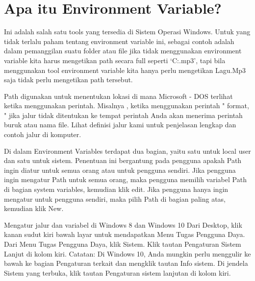 
\section {Apa itu Environment Variable?}

Ini adalah salah satu tools yang tersedia di Sistem Operasi Windows. Untuk yang tidak terlalu paham tentang environment variable ini, sebagai contoh adalah dalam pemanggilan suatu folder atau file jika tidak menggunakan environment variable kita harus mengetikan path secara full seperti `C:\Music\Lagu.mp3', tapi bila menggunakan tool environment variable kita hanya perlu mengetikan Lagu.Mp3 saja tidak perlu mengetikan path tersebut.

Path digunakan untuk menentukan lokasi di mana Microsoft - DOS terlihat ketika menggunakan perintah. Misalnya , ketika menggunakan perintah " format, " jika jalur tidak ditentukan ke tempat perintah Anda akan menerima perintah buruk atau nama file.  Lihat definisi jalur kami untuk penjelasan lengkap dan contoh jalur di komputer.

Di dalam Environment Variables terdapat dua bagian, yaitu satu untuk local user dan satu untuk sistem. Penentuan ini bergantung pada pengguna apakah Path ingin diatur untuk semua orang atau untuk pengguna sendiri. Jika pengguna ingin mengatur Path untuk semua orang, maka pengguna memilih variabel Path di bagian system variables, kemudian klik edit. Jika pengguna hanya ingin mengatur untuk pengguna sendiri, maka pilih Path di bagian paling atas, kemudian klik New. \cite{berger2005setting}

Mengatur jalur dan variabel di Windows 8 dan Windows 10
Dari Desktop, klik kanan sudut kiri bawah layar untuk mendapatkan Menu Tugas Pengguna Daya.
Dari Menu Tugas Pengguna Daya, klik Sistem.
Klik tautan Pengaturan Sistem Lanjut di kolom kiri.
Catatan: Di Windows 10, Anda mungkin perlu menggulir ke bawah ke bagian Pengaturan terkait dan mengklik tautan Info sistem. Di jendela Sistem yang terbuka, klik tautan Pengaturan sistem lanjutan di kolom kiri.

